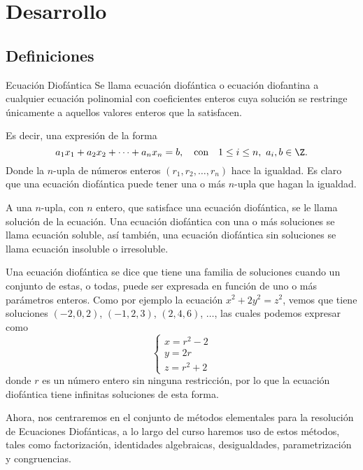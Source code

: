 \section{Desarrollo}

\subsection{Definiciones}

\begin{box.definition}{Ecuación Diofántica}{}
    Se llama {ecuación diofántica} o {ecuación diofantina} a cualquier ecuación polinomial con coeficientes enteros cuya
    solución se restringe únicamente a aquellos valores enteros que la satisfacen.
\end{box.definition}

Es decir, una expresión de la forma
\[
    a_1 x_1 + a_2 x_2 + \cdots + a_n x_n = b, \quad \text{con} \quad 1 \leq i \leq n,\ a_i, b \in \Z.
\]
Donde la $n$-upla de números enteros $(r_1, r_2, \ldots, r_n)$ hace la igualdad.
Es claro que una ecuación diofántica puede tener una o más $n$-upla que hagan la igualdad.

\begin{box.definition}{}{}
    A una $n$-upla, con $n$ entero, que satisface una ecuación diofántica, se le llama {solución} de la ecuación.
    Una ecuación diofántica con una o más soluciones se llama ecuación {soluble}, así también, una ecuación diofántica sin
    soluciones se llama ecuación {insoluble} o {irresoluble}.
\end{box.definition}

Una ecuación diofántica se dice que tiene una familia de soluciones cuando un conjunto de estas, o todas, puede ser expresada en función de uno o más parámetros enteros.
Como por ejemplo la ecuación $x^2 + 2y^2 = z^2$, vemos que tiene soluciones $(-2, 0, 2)$, $(-1, 2, 3)$, $(2, 4, 6)$, $\ldots$, las cuales podemos expresar como
\[
    \begin{cases}
        x = r^2 - 2\\
        y = 2r\\
        z = r^2 + 2
    \end{cases}
\]
donde $r$ es un número entero sin ninguna restricción, por lo que la ecuación diofántica tiene infinitas soluciones de esta forma.

Ahora, nos centraremos en el conjunto de métodos elementales para la resolución de Ecuaciones Diofánticas, a lo largo del curso
haremos uso de estos métodos, tales como factorización, identidades algebraicas, desigualdades, parametrización y congruencias.

